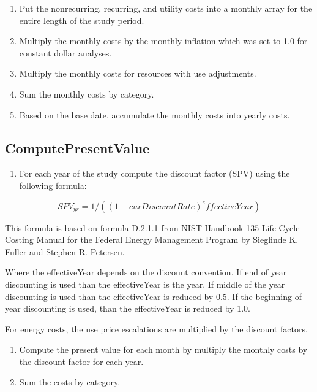 \begin{enumerate}
\def\labelenumi{Step~\arabic{enumi}.}
\setcounter{enumi}{3}
\item Put the nonrecurring, recurring, and utility costs into a monthly array for the entire length of the study period.
\item Multiply the monthly costs by the monthly inflation which was set to 1.0 for constant dollar analyses.
\item Multiply the monthly costs for resources with use adjustments.
\item Sum the monthly costs by category.
\item Based on the base date, accumulate the monthly costs into yearly costs.
\end{enumerate}

\subsection{ComputePresentValue}\label{computepresentvalue}

\begin{enumerate}
\def\labelenumi{Step~\arabic{enumi}.}
\item For each year of the study compute the discount factor (SPV) using the following formula:
\end{enumerate}

\begin{equation}
SPV_{yr} = 1 / ((1 + curDiscountRate) ^ effectiveYear)
\end{equation}

This formula is based on formula D.2.1.1 from NIST Handbook 135 Life Cycle Costing Manual for the Federal Energy Management Program by Sieglinde K. Fuller and Stephen R. Petersen.

Where the effectiveYear depends on the discount convention. If end of year discounting is used than the effectiveYear is the year. If middle of the year discounting is used than the effectiveYear is reduced by 0.5. If the beginning of year discounting is used, than the effectiveYear is reduced by 1.0.

For energy costs, the use price escalations are multiplied by the discount factors.

\begin{enumerate}
\def\labelenumi{Step~\arabic{enumi}.}
\setcounter{enumi}{1}
\item Compute the present value for each month by multiply the monthly costs by the discount factor for each year.
\item Sum the costs by category.
\end{enumerate}

